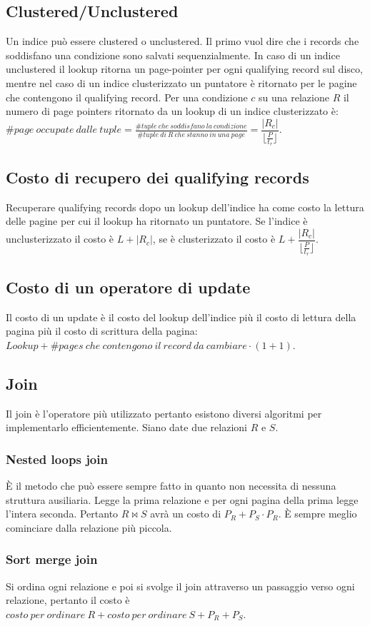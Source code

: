 \subsection{Clustered/Unclustered}
Un indice pu\`o essere clustered o unclustered. Il primo vuol dire che i records che soddisfano una condizione sono salvati sequenzialmente. In caso di un indice unclustered il lookup ritorna un page-pointer per
ogni qualifying record sul disco, mentre nel caso di un indice clusterizzato un puntatore \`e ritornato per le pagine che contengono il qualifying record. Per una condizione $c$ su una relazione $R$ il numero
di page pointers ritornato da un lookup di un indice clusterizzato \`e: $\# page\ occupate\ dalle\ tuple=\frac{\# tuple\ che\ soddisfano\ la\ condizione}{\# tuple\ di\ R\ che\ stanno\ in\ una\ page}=\dfrac{|R_c|}{
\lfloor \frac{P}{t_r}\rfloor}$.
\subsection{Costo di recupero dei qualifying records}
Recuperare qualifying records dopo un lookup dell'indice ha come costo la lettura delle pagine per cui il lookup ha ritornato un puntatore. Se l'indice \`e unclusterizzato il costo \`e $L+|R_c|$, se \`e 
clusterizzato il costo \`e $L+\dfrac{|R_c|}{\lfloor \frac{P}{t_r}\rfloor}$. 
\subsection{Costo di un operatore di update}
Il costo di un update \`e il costo del lookup dell'indice pi\`u il costo di lettura della pagina pi\`u il costo di scrittura della pagina: $Lookup+\# pages\ che\ contengono\ il\ record\ da\ cambiare\cdot(1+1)$.
\subsection{Join}
Il join \`e l'operatore pi\`u utilizzato pertanto esistono diversi algoritmi per implementarlo efficientemente. Siano date due relazioni $R$ e $S$.
\subsubsection{Nested loops join}
\`E il metodo che pu\`o essere sempre fatto in quanto non necessita di nessuna struttura ausiliaria. Legge la prima relazione e per ogni pagina della prima legge l'intera seconda. Pertanto $R\bowtie S$ avr\`a
un costo di $P_R+P_S\cdot P_R$. \`E sempre meglio cominciare dalla relazione pi\`u piccola.
\subsubsection{Sort merge join}
Si ordina ogni relazione e poi si svolge il join attraverso un passaggio verso ogni relazione, pertanto il costo \`e $costo\ per\ ordinare\ R+costo\ per\ ordinare\ S+P_R+P_S$. 
